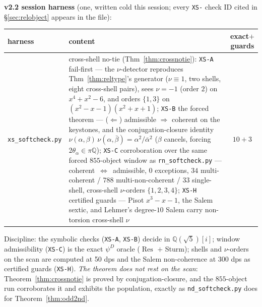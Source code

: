 \documentclass[11pt]{article}
\newcommand{\hx}[1]{\textcolor{cC}{\footnotesize\texttt{#1}}}
\newcommand{\Q}{\mathbb{Q}}
\theoremstyle{plain}
\theoremstyle{definition}
\theoremstyle{remark}
\begin{document}
\smallskip\noindent
\textbf{v2.2 session harness} (one, written cold this session; every \hx{XS-}
check ID cited in \S\ref{sec:relobject} appears in the file):
\begin{center}\footnotesize\setlength{\tabcolsep}{4pt}
\begin{tabular}{@{}lp{10.7cm}c@{}}
\toprule
harness & content & exact$+$guards\\
\midrule
\texttt{xs\_softcheck.py} & cross-shell no-tie (Thm~\ref{thm:crossnotie}): \hx{XS-A} fail-first --- the $\nu$-detector reproduces Thm~\ref{thm:reltype}'s generator ($\nu\equiv1$, two shells, eight cross-shell pairs), sees $\nu=-1$ (order $2$) on $x^4+x^2-6$, and orders $\{1,3\}$ on $(x^2-x-1)(x^2+x+1)$; \hx{XS-B} the forced theorem --- ($\Leftarrow$) admissible $\Rightarrow$ coherent on the keystones, and the conjugation-closure identity $\nu(\alpha,\beta)\,\nu(\alpha,\bar\beta)=\alpha^2/\bar\alpha^2$ ($\beta$ cancels, forcing $2\theta_\alpha\in\pi\Q$); \hx{XS-C} corroboration over the same forced $855$-object window as \texttt{rn\_softcheck.py} --- coherent~$\iff$~admissible, $0$ exceptions, $34$ multi-coherent / $788$ multi-non-coherent / $33$ single-shell, cross-shell $\nu$-orders $\{1,2,3,4\}$; \hx{XS-H} certified guards --- Pisot $x^3-x-1$, the Salem sextic, and Lehmer's degree-$10$ Salem carry non-torsion cross-shell $\nu$ & $10+3$\\
\bottomrule
\end{tabular}
\end{center}
Discipline: the symbolic checks (\hx{XS-A}, \hx{XS-B}) decide in $\Q(\sqrt5)[i]$;
window admissibility (\hx{XS-C}) is the exact $\psi^D$ oracle
($\operatorname{Res}$ $+$ Sturm); shells and $\nu$-orders on the scan are computed
at 50 dps and the Salem non-coherence at 300 dps as certified guards (\hx{XS-H}).
\emph{The theorem does not rest on the scan}: Theorem~\ref{thm:crossnotie} is
proved by conjugation-closure, and the $855$-object run corroborates it and
exhibits the population, exactly as \texttt{nd\_softcheck.py} does for
Theorem~\ref{thm:odd2nd}.
\end{document}
